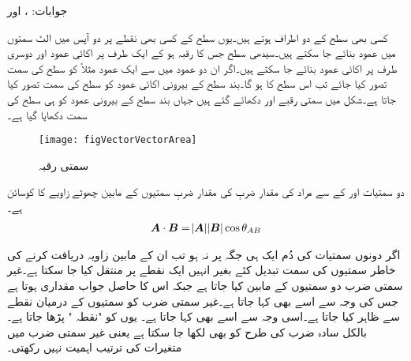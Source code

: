 جوابات: ،  اور 




کسی بھی سطح کے دو اطراف ہوتے ہیں۔یوں سطح کے کسی بھی نقطے پر دو آپس میں الٹ سمتوں میں عمود بنائے جا سکتے ہیں۔سیدھی سطح جس کا رقبہ  ہو کے ایک طرف پر اکائی عمود  اور دوسری طرف پر اکائی عمود  بنائے جا سکتے ہیں۔اگر ان دو عمود میں سے ایک عمود مثلاً  کو سطح کی سمت تصور کیا جائے تب اس سطح کا   ہو گا۔بند سطح کے  بیرونی اکائی عمود کو سطح کی سمت تصور کیا جاتا ہے۔شکل  میں سمتی رقبے  اور  دکھائے گئے ہیں جہاں بند سطح کے بیرونی عمود کو ہی سطح کی سمت دکھایا گیا ہے۔
\begin{figure}
\centering
\texttt{[image: figVectorVectorArea]}
\caption{سمتی رقبہ}
\label{شکل_سمتیہ_سمتی_رقبہ}
\end{figure}


دو سمتیات  اور  کے  سے مراد  کی مقدار ضربِ   کی مقدار ضربِ سمتیوں کے مابین چھوٹے زاویے کا کوسائن ہے۔
\begin{align}\label{مساوات_سمتیہ_مقداری_ضرب}
{\ensuremath{{\boldsymbol{A}}}} \cdot {\ensuremath{{\boldsymbol{B}}}}=\abs{{{\boldsymbol{A}}}} \abs{{{\boldsymbol{B}}}} \cos \theta_{AB}
\end{align}

اگر دونوں سمتیات کی دُم ایک ہی جگہ پر نہ ہو تب ان کے مابین زاویہ دریافت کرنے کی  خاطر سمتیوں کی سمت تبدیل کئے بغیر انہیں ایک نقطے پر منتقل کیا جا سکتا ہے۔غیر سمتی ضرب دو سمتیوں کے مابین کیا جاتا ہے جبکہ اس کا حاصل جواب مقداری ہوتا ہے جس کی وجہ سے اسے   بھی کہا جاتا ہے۔غیر سمتی ضرب کو سمتیوں کے درمیان نقطے سے ظاہر کیا جاتا ہے۔اسی وجہ سے اسے  بھی کہا جاتا ہے۔ یوں  کو "نقطہ " پڑھا جاتا ہے۔بالکل سادہ ضرب کی طرح  کو  بھی لکھا جا سکتا ہے یعنی غیر سمتی ضرب میں متغیرات کی ترتیب اہمیت نہیں رکھتی۔

